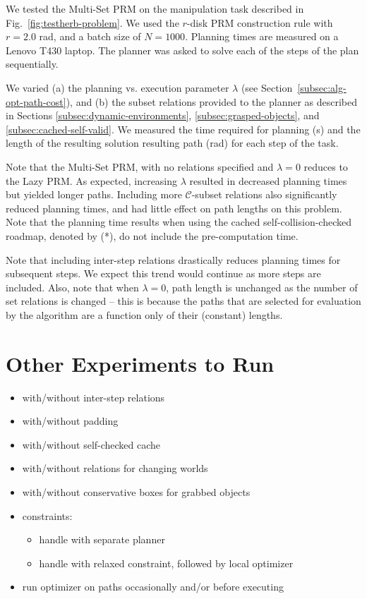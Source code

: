 \documentclass{report}
\begin{document}
We tested the Multi-Set PRM on the manipulation task
described in Fig.~\ref{fig:testherb-problem}.
We used the $r$-disk PRM construction rule with $r=2.0$ rad,
and a batch size of $N=1000$.
Planning times are measured on a Lenovo T430 laptop.
The planner was asked to solve each of the steps of the plan
sequentially.

We varied
(a) the planning vs. execution parameter $\lambda$
(see Section~\ref{subsec:alg-opt-path-cost}), and
(b) the subset relations provided to the planner
as described in Sections
\ref{subsec:dynamic-environments},
\ref{subsec:grasped-objects},
and \ref{subsec:cached-self-valid}.
We measured the time required for planning (s)
and the length of the resulting solution resulting path (rad)
for each step of the task.

Note that the Multi-Set PRM,
with no relations specified and $\lambda=0$
reduces to the Lazy PRM.
As expected,
increasing $\lambda$ resulted in decreased planning times
but yielded longer paths.
Including more $\mathcal{C}$-subset relations
also significantly reduced planning times,
and had little effect on path lengths on this problem.
Note that the planning time results when using
the cached self-collision-checked roadmap, denoted by (*),
do not include the pre-computation time.

Note that including inter-step relations drastically
reduces planning times for subsequent steps.
We expect this trend would continue as more steps are included.
Also, note that when $\lambda=0$,
path length is unchanged as the number of set relations is
changed
-- this is because the paths that are selected for evaluation
by the algorithm are a function only of their (constant) lengths.

\section{Other Experiments to Run}

\begin{itemize}
\item with/without inter-step relations
\item with/without padding
\item with/without self-checked cache
\item with/without relations for changing worlds
\item with/without conservative boxes for grabbed objects
\item constraints:
   \begin{itemize}
   \item handle with separate planner
   \item handle with relaxed constraint, followed by local optimizer
   \end{itemize}
\item run optimizer on paths occasionally and/or before executing
\end{itemize}
\end{document}
